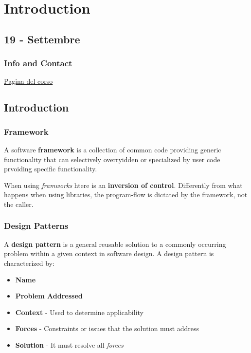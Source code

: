 \chapter{Introduction}
\section*{19 - Settembre}
\subsection*{Info and Contact}

\href{https://pages.di.unipi.it/corradini/Didattica/AP-23/}{Pagina del corso}
\section{Introduction}
\subsection{Framework}
A software \textbf{framework} is a collection of common code providing generic functionality that can selectively overryidden or specialized by user code prvoiding specific functionality.

When using \textit{framworks} htere is an \textbf{inversion of control}.
Differently from what happens when using libraries,
the program-flow is dictated by the framework, not the caller.

\subsection{Design Patterns}
A \textbf{design pattern} is a general reusable solution to a commonly occurring problem within a given context in software design. 
A design pattern is characterized by:
\begin{itemize}
    \item \textbf{Name}
	\item \textbf{Problem Addressed}
	\item \textbf{Context} - Used to determine applicability
	\item \textbf{Forces} - Constraints or issues that the solution must address
	\item \textbf{Solution} - It must resolve all \textit{forces}
\end{itemize}

